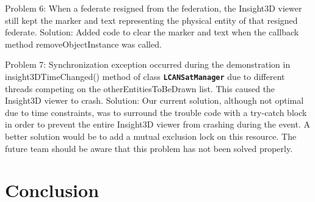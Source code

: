 \documentclass[conference]{IEEEtran}
\newcommand\uml[1]{\texttt{\textbf{#1}}}
\begin{document}
Problem 6: When a federate resigned from the federation, the Insight3D viewer still kept the marker and text representing the physical entity of that resigned federate.
Solution: Added code to clear the marker and text when the callback method removeObjectInstance was called.

Problem 7: Synchronization exception occurred during the demonstration in insight3DTimeChanged() method of class \uml{LCANSatManager} due to different threads competing on the otherEntitiesToBeDrawn list. This caused the Insight3D viewer to crash.
Solution: Our current solution, although not optimal due to time constraints, was to surround the trouble code with a try-catch block in order to prevent the entire Insight3D viewer from crashing during the event. A better solution would be to add a mutual exclusion lock on this resource. The future team should be aware that this problem has not been solved properly.

\section{Conclusion}






%
%







\end{document}
